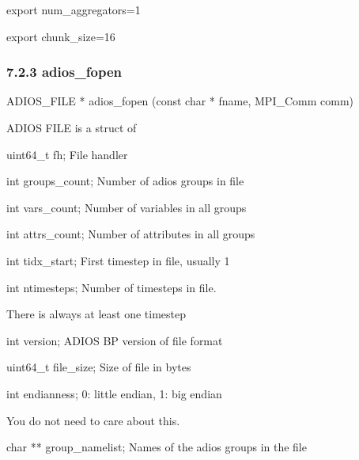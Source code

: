 \vspace{10pt}
export num\_aggregators=1

\vspace{10pt}
export chunk\_size=16\label{HToc182553401}

\vspace{22pt}
\subsubsection*{{\large \textbf{7.2.3 adios\_fopen }}}

\vspace{10pt}
ADIOS\_FILE * adios\_fopen (const char * fname, MPI\_Comm comm)

\vspace{22pt}
ADIOS FILE is a struct of

\vspace{10pt}
\leftskip=22pt
uint64\_t fh; File handler

\vspace{10pt}
int groups\_count; Number of adios groups in file      

\vspace{10pt}
int vars\_count; Number of variables in all groups  

\vspace{10pt}
int attrs\_count; Number of attributes in all groups

\vspace{10pt}
int tidx\_start; First timestep in file, usually 1

\vspace{10pt}
int ntimesteps; Number of timesteps in file. 

\vspace{10pt}
\parindent=39pt
There is always at least one timestep

\vspace{10pt}
\parindent=0pt
int version; ADIOS BP version of file format  

\vspace{10pt}
uint64\_t file\_size;  Size of file in bytes 

\vspace{10pt}
int  endianness;  0: little endian, 1: big endian 

\vspace{10pt}
\parindent=39pt
You do not need to care about this.

\vspace{10pt}
\parindent=0pt
char   **  group\_namelist; Names of the adios groups in the file 

